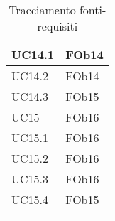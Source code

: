 \begin{longtable}{|l|p{4cm}|}
\hline
		UC14.1 & FOb14 \linebreak   \\
\hline
		UC14.2 & FOb14 \linebreak   \\
\hline
		UC14.3 & FOb15 \linebreak   \\
\hline
		UC15 & FOb16 \linebreak   \\
\hline
		UC15.1 & FOb16 \linebreak   \\
\hline
		UC15.2 & FOb16 \linebreak   \\
\hline
		UC15.3 & FOb16 \linebreak   \\
\hline
		UC15.4 & FOb15 \linebreak   \\
\hline
\caption{Tracciamento fonti-requisiti}
\end{longtable}